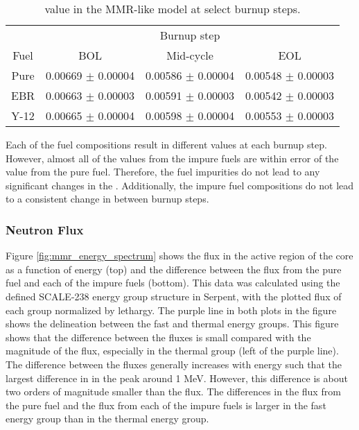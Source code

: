 \begin{table}[ht]
        \centering
        \caption{\betaEff value in the \gls{MMR}-like model at 
        select burnup steps.}
        \label{tab:mmr_betaeff}
        \begin{tabular}{c c c c}
                \hline 
                 & \multicolumn{3}{c}{Burnup step}\\
                Fuel & \gls{BOL} & Mid-cycle & \gls{EOL}\\
                \hline 
                Pure & 0.00669 $\pm$ 0.00004 & 0.00586 $\pm$ 0.00004 & 0.00548 $\pm$ 0.00003\\
                \gls{EBR} & 0.00663 $\pm$ 0.00003 & 0.00591 $\pm$ 0.00003 & 0.00542 $\pm$ 0.00003\\
                Y-12 & 0.00665 $\pm$ 0.00004 &  0.00598 $\pm$ 0.00004& 0.00553 $\pm$ 0.00003\\
                \hline 

        \end{tabular}
\end{table}

Each of the fuel compositions result in different \betaEff values at 
each burnup step. However, almost all of the values from the impure 
fuels are within error of the value from the pure fuel. Therefore, the 
fuel impurities do not lead to any significant changes in the 
\betaEff. Additionally, the impure fuel compositions do not lead to 
a consistent change in \betaEff between burnup steps. 

\subsubsection{Neutron Flux}

Figure \ref{fig:mmr_energy_spectrum} shows the flux in the active 
region of the core as a function of energy (top) and the difference between 
the flux from the pure fuel and each of the impure fuels (bottom). This 
data was 
calculated using the defined SCALE-238 energy group structure in Serpent,
with the plotted flux of each group normalized by lethargy. The purple 
line in both plots in the figure shows the delineation between the fast and 
thermal energy groups. This figure shows that the difference between 
the fluxes is small compared with the magnitude of the flux, especially in 
the thermal group (left of the purple line). The difference between the 
fluxes generally increases with energy such that the largest difference in 
in the peak around 1 MeV. However, this difference is about two orders 
of magnitude smaller than the flux. The differences 
in the flux from the pure fuel and the flux from each of the impure 
fuels is larger in the fast energy group than in the thermal energy group.

